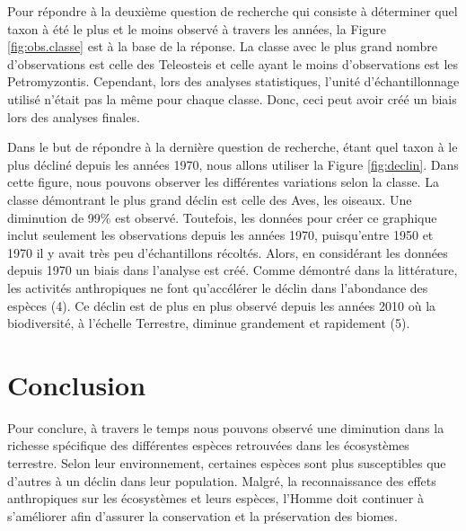 \documentclass[9pt,twocolumn,twoside,]{pnas-new}
\begin{document}
Pour répondre à la deuxième question de recherche qui consiste à
déterminer quel taxon à été le plus et le moins observé à travers les
années, la Figure \ref{fig:obs.classe} est à la base de la réponse. La
classe avec le plus grand nombre d'observations est celle des Teleosteis
et celle ayant le moins d'observations est les Petromyzontis. Cependant,
lors des analyses statistiques, l'unité d'échantillonnage utilisé
n'était pas la même pour chaque classe. Donc, ceci peut avoir créé un
biais lors des analyses finales.

Dans le but de répondre à la dernière question de recherche, étant quel
taxon à le plus décliné depuis les années 1970, nous allons utiliser la
Figure \ref{fig:declin}. Dans cette figure, nous pouvons observer les
différentes variations selon la classe. La classe démontrant le plus
grand déclin est celle des Aves, les oiseaux. Une diminution de 99\% est
observé. Toutefois, les données pour créer ce graphique inclut seulement
les observations depuis les années 1970, puisqu'entre 1950 et 1970 il y
avait très peu d'échantillons récoltés. Alors, en considérant les
données depuis 1970 un biais dans l'analyse est créé. Comme démontré
dans la littérature, les activités anthropiques ne font qu'accélérer le
déclin dans l'abondance des espèces (4). Ce déclin est de plus en plus
observé depuis les années 2010 où la biodiversité, à l'échelle
Terrestre, diminue grandement et rapidement (5).

\section{Conclusion}\label{conclusion}

Pour conclure, à travers le temps nous pouvons observé une diminution
dans la richesse spécifique des différentes espèces retrouvées dans les
écosystèmes terrestre. Selon leur environnement, certaines espèces sont
plus susceptibles que d'autres à un déclin dans leur population. Malgré,
la reconnaissance des effets anthropiques sur les écosystèmes et leurs
espèces, l'Homme doit continuer à s'améliorer afin d'assurer la
conservation et la préservation des biomes.

\showmatmethods
\showacknow
\pnasbreak
\end{document}
